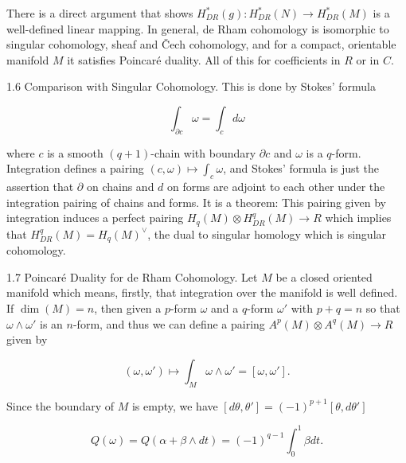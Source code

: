 There is a direct argument that shows $H^*_{DR}(g): H^*_{DR}(N) \rightarrow H^*_{DR}(M)$ is a well-defined linear mapping. In general, de Rham cohomology is isomorphic to singular cohomology, sheaf and Čech cohomology, and for a compact, orientable manifold $M$ it satisfies Poincaré duality. All of this for coefficients in $R$ or in $C$.

1.6 Comparison with Singular Cohomology. This is done by Stokes' formula

$$\int_{\partial c} \omega = \int_c d\omega$$

where $c$ is a smooth $(q+1)$-chain with boundary $\partial c$ and $\omega$ is a $q$-form. Integration defines a pairing $(c, \omega) \mapsto \int_c \omega$, and Stokes' formula is just the assertion that $\partial$ on chains and $d$ on forms are adjoint to each other under the integration pairing of chains and forms. It is a theorem: This pairing given by integration induces a perfect pairing $H_q(M) \otimes H^q_{DR}(M) \rightarrow R$ which implies that $H^q_{DR}(M) = H_q(M)^\vee$, the dual to singular homology which is singular cohomology.

1.7 Poincaré Duality for de Rham Cohomology. Let $M$ be a closed oriented manifold which means, firstly, that integration over the manifold is well defined. If $\dim(M) = n$, then given a $p$-form $\omega$ and a $q$-form $\omega'$ with $p+q=n$ so that $\omega \wedge \omega'$ is an $n$-form, and thus we can define a pairing $A^p(M) \otimes A^q(M) \rightarrow R$ given by

$$(\omega, \omega') \mapsto \int_M \omega \wedge \omega' = [\omega, \omega'].$$

Since the boundary of $M$ is empty, we have $[d\theta, \theta'] = (-1)^{p+1}[\theta, d\theta']$

$$Q(\omega) = Q(\alpha + \beta \wedge dt) = (-1)^{q-1} \int_0^1 \beta dt.$$
